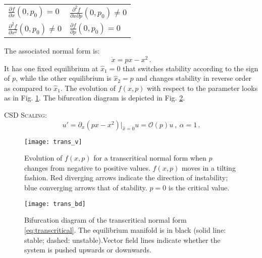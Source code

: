 \begin{table}[h!]
	\centering
	\begin{tabular}{ll}
		$\frac{\partial f}{\partial x}(0,p_0)  = 0$ & $\frac{\partial^2 f}{\partial x \partial p}(0,p_0)  \neq 0$   \\
		$\frac{\partial^2 f}{\partial x^2}(0,p_0) \neq 0$ &   $\frac{\partial f}{\partial p}(0,p_0) = 0$
	\end{tabular}
\end{table}

The associated normal form is:
\begin{equation}
	\dot{x} = px-x^2 \, .
	\label{eq:transcritical}
\end{equation}
It has one fixed equilibrium at $\hat{x}_1 = 0$ that switches stability according to the sign of $p$, while the other equilibrium is $\hat{x}_2 =p$ and changes stability in reverse order as compared to $\hat{x}_1$. The evolution of $f(x,p)$ with respect to the parameter looks as in Fig. \ref{fig:trans_diagram}. The bifurcation diagram is depicted in Fig. \ref{fig:trans_diagram_bif}. 

\textsc{CSD Scaling:}
\begin{equation}
	u' = \partial_x(px-x^2)|_{\hat{x} = 0}u = \mathcal{O}(p) u \ , \ \alpha =1 \, .
\end{equation}



\begin{figure}[h!]
	\centering
	\texttt{[image: trans\_v]}
	\caption{\small Evolution of $f(x,p)$ for a transcritical normal form when $p$ changes from negative to positive values. $f(x,p)$ moves in a tilting fashion. Red diverging arrows indicate the direction of instability; blue converging arrows that of stability. $p=0$ is the critical value. }
	\label{fig:trans_diagram}
\end{figure}


\begin{figure}[h!]
	\centering
	\texttt{[image: trans\_bd]}
	\caption{\small Bifurcation diagram of the transcritical normal form \ref{eq:transcritical}. The equilibrium manifold is in black (solid line: stable; dashed: unstable).Vector field lines indicate whether the system is pushed upwards or downwards. }
	\label{fig:trans_diagram_bif}
\end{figure}







